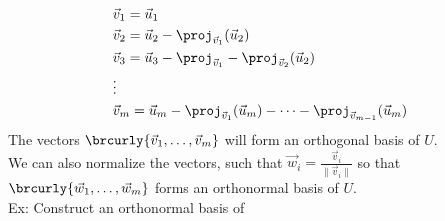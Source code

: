 \begin{align*}
    &\vec{v}_1=\vec{u}_1\\
    &\vec{v}_2=\vec{u}_2-\proj_{\vec{v}_1}(\vec{u}_2)\\
    &\vec{v}_3=\vec{u}_3-\proj_{\vec{v}_1}-\proj_{\vec{v}_2}(\vec{u}_2)\\
    &\vdots\\
    &\vec{v}_m=\vec{u}_m-\proj_{\vec{v}_1}(\vec{u}_m)-\cdots-\proj_{\vec{v}_{m-1}}(\vec{u}_m)
\end{align*}
The vectors $\brcurly{\vec{v}_1,\ldots,\vec{v}_m}$ will form an orthogonal basis of $U$.\\
We can also normalize the vectors, such that $\vec{w}_i=\frac{\vec{v}_i}{\|\vec{v}_i\|}$ so that $\brcurly{\vec{w}_1,\ldots,\vec{w}_m}$ forms an orthonormal basis of $U$.\\
Ex: Construct an orthonormal basis of
